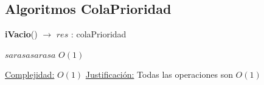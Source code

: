 \begin{Algoritmos}
\subsection{Algoritmos ColaPrioridad}


\begin{algorithm}[H]
{\textbf{iVacio}() $\to$ $res$ : colaPrioridad}
\begin{algorithmic}[1]
	\State $sarasa sarasa$ \Comment $O(1)$

	\medskip
	\Statex \underline{Complejidad:} $O(1)$
	\Statex \underline{Justificaci\'on:} Todas las operaciones son $O(1)$ 
\end{algorithmic}
\end{algorithm}
   
   
   
\end{Algoritmos}
